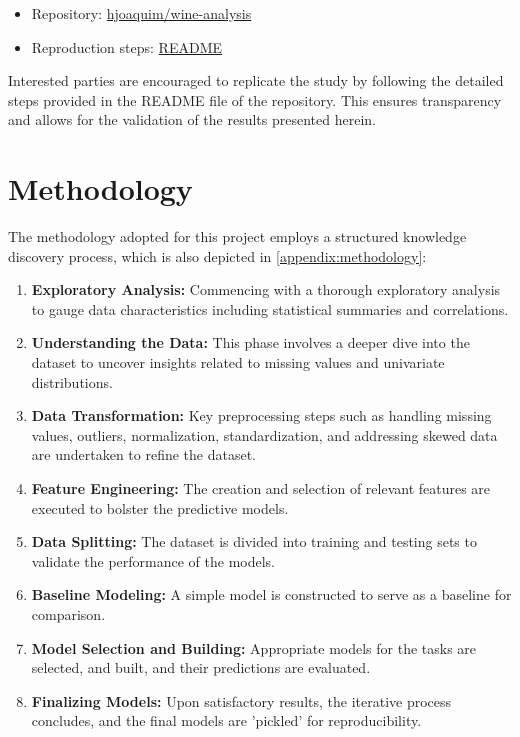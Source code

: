 \documentclass{article}
\begin{document}
\begin{itemize}
    \item Repository: \href{https://github.com/hjoaquim/applied-ai/tree/main/wine-analysis}{hjoaquim/wine-analysis}
    \item Reproduction steps: \href{https://github.com/hjoaquim/applied-ai/blob/main/wine-analysis/README.md}{README}
\end{itemize}

Interested parties are encouraged to replicate the study by following the detailed steps provided in the README file of the repository. This ensures transparency and allows for the validation of the results presented herein.


\section{Methodology} \label{methodology}

The methodology adopted for this project employs a structured knowledge discovery process, which is also depicted in \ref{appendix:methodology}:

\begin{enumerate}
\item \textbf{Exploratory Analysis:} Commencing with a thorough exploratory analysis to gauge data characteristics including statistical summaries and correlations.
\item \textbf{Understanding the Data:} This phase involves a deeper dive into the dataset to uncover insights related to missing values and univariate distributions.
\item \textbf{Data Transformation:} Key preprocessing steps such as handling missing values, outliers, normalization, standardization, and addressing skewed data are undertaken to refine the dataset.
\item \textbf{Feature Engineering:} The creation and selection of relevant features are executed to bolster the predictive models.
\item \textbf{Data Splitting:} The dataset is divided into training and testing sets to validate the performance of the models.
\item \textbf{Baseline Modeling:} A simple model is constructed to serve as a baseline for comparison.
\item \textbf{Model Selection and Building:} Appropriate models for the tasks are selected, and built, and their predictions are evaluated.
\item \textbf{Finalizing Models:} Upon satisfactory results, the iterative process concludes, and the final models are 'pickled' for reproducibility.
\end{enumerate}
\end{document}
